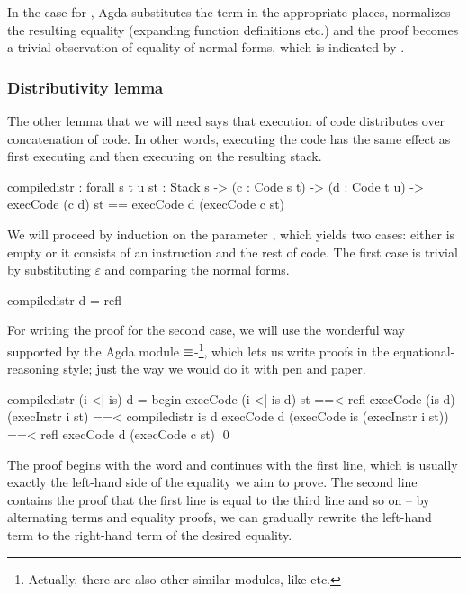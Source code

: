 \noindent In the case for , Agda substitutes the term 
in the appropriate places, normalizes the resulting equality (expanding
function definitions etc.) and the proof becomes a trivial observation of
equality of normal forms, which is indicated by .

\subsubsection{Distributivity lemma}

The other lemma that we will need says that execution of code distributes over
concatenation of code. In other words, executing the code  has the same effect as first executing  and then executing
 on the resulting stack.

\begin{code}
  compile\-distr : forall {s t u} {st : Stack s}
    -> (c : Code s t) -> (d : Code t u)
    -> execCode (c \app d) st == execCode d (execCode c st)
\end{code}

\noindent We will proceed by induction on the parameter , which yields
two cases: either  is empty or it consists of an instruction and the
rest of code. The first case is trivial by substituting $\varepsilon$ and
comparing the normal forms.

\begin{code}
  compile\-distr \nil d = refl
\end{code}

\noindent For writing the proof for the second case, we will use the wonderful
way supported by the Agda module $\mathsf{\equiv}$-\footnote{Actually,
there are also other similar modules, like  etc.}, which
lets us write proofs in the equational-reasoning style; just the way we would
do it with pen and paper.

\begin{code}
  compile\-distr (i <| is) d = begin
    execCode (i <| is \app d) st
      ==< refl \>
    execCode (is \app d) (execInstr i st)
      ==< compile\-distr is d \>
    execCode d (execCode is (execInstr i st))
      ==< refl \>
    execCode d (execCode c st)
    \qed
\end{code}

\noindent The proof begins with the word  and continues with the
first line, which is usually exactly the left-hand side of the equality we aim
to prove.  The second line contains the proof that the first line is equal to
the third line and so on -- by alternating terms and equality proofs, we can
gradually rewrite the left-hand term to the right-hand term of the desired
equality.

